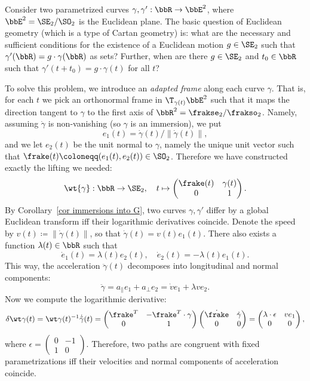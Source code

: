 \begin{example}\label{ex curves in E2}
    Consider two parametrized curves $\gamma,\gamma':\bbR\to \bbE^2$, where $\bbE^2=\SE_2\slash\SO_2$ is the Euclidean plane. The basic question of Euclidean geometry (which is a type of Cartan geometry) is: what are the necessary and sufficient conditions for the existence of a Euclidean motion $g\in\SE_2$ such that $\gamma'(\bbR)=g\cdot \gamma(\bbR)$ as sets? Further, when are there $g\in\SE_2$ and $t_0\in\bbR$ such that $\gamma'(t+t_0)=g\cdot \gamma(t)$ for all $t$?

    To solve this problem, we introduce an \emph{adapted frame} along each curve $\gamma$. That is, for each $t$ we pick an orthonormal frame in $\T_{\gamma(t)}\bbE^2$ such that it maps the direction tangent to $\gamma$ to the first axis of $\bbR^2=\frakse_2\slash\frakso_2$. Namely, assuming $\dot\gamma$ is non-vanishing (so $\gamma$ is an immersion), we put 
    \[e_1(t)=\dot\gamma(t)\slash \lVert\dot\gamma(t)\rVert,\] 
    and we let $e_2(t)$ be the unit normal to $\gamma$, namely the unique unit vector such that $\frake(t)\coloneqq (e_1(t),e_2(t))\in\SO_2$. Therefore we have constructed exactly the lifting we needed:
    \[\wt{\gamma}:\bbR\to \SE_2,\quad t\mapsto\begin{pmatrix}
        \frake(t)&\gamma(t) \\
        0&  1
    \end{pmatrix}.\]
    By Corollary~\ref{cor immersions into G}, two curves $\gamma,\gamma'$ differ by a global Euclidean transform iff their logarithmic derivatives coincide. Denote the speed by $v(t)\coloneqq \lVert\dot\gamma(t)\rVert$, so that $\dot\gamma(t)=v(t)e_1(t)$. There also exists a function $\lambda(t)\in\bbR$ such that 
    \[\dot e_1(t)=\lambda(t)e_2(t),\quad \dot e_2(t)=-\lambda(t)e_1(t).\]
    This way, the acceleration $\ddot{\gamma}(t)$ decomposes into longitudinal and normal components:
    \[\ddot\gamma=a_{\parallel}e_1+a_{\perp}e_2=\dot ve_1+\lambda ve_2.\]
    Now we compute the logarithmic derivative:
    \[\delta\wt\gamma(t)=\wt\gamma(t)^{-1}\dot{\tilde\gamma}(t)=
    \begin{pmatrix}
        \frake^T & -\frake^T\cdot\gamma\\
        0 & 1
    \end{pmatrix} 
    \begin{pmatrix}
        \dot\frake & \dot\gamma\\
        0 & 0
    \end{pmatrix}
    =
    \begin{pmatrix}
        \lambda\cdot\epsilon & ve_1\\
        0 & 0
    \end{pmatrix},
    \]
    where $\epsilon=\left(\begin{smallmatrix}
        0&-1\\
        1&0
    \end{smallmatrix}\right)$. Therefore, two paths are congruent with fixed parametrizations iff their velocities and normal components of acceleration coincide. 
    

\end{example}
